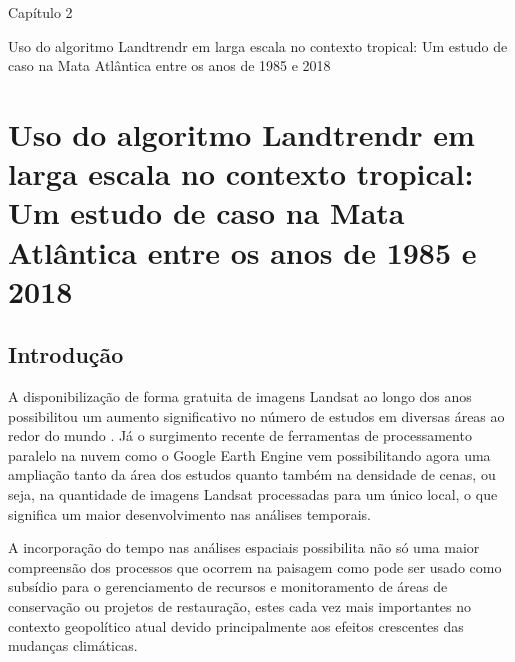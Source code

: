 \begin{titlepage}
    \centering
    \vspace*{\fill}

    \vspace*{0.5cm}
    
    \Large%
    Capítulo 2

    \vspace*{1cm}

    \Large%
    Uso do algoritmo Landtrendr em larga escala no contexto tropical: Um estudo de caso na Mata Atlântica entre os anos de 1985 e 2018

    \vspace*{5cm}


    \vspace*{\fill}
\end{titlepage}

\section{Uso do algoritmo Landtrendr em larga escala no contexto tropical: Um estudo de caso na Mata Atlântica entre os anos de 1985 e 2018}


\subsection{Introdução}
\hspace{13pt} A disponibilização de forma gratuita de imagens Landsat ao longo dos anos possibilitou um aumento significativo no número de estudos em diversas áreas ao redor do mundo \citep{ZHU2019382, WULDER20122}. Já o surgimento recente de ferramentas de processamento paralelo na nuvem como o Google Earth Engine \citep{GORELICK201718} vem possibilitando agora uma ampliação tanto da área dos estudos quanto também na densidade de cenas, ou seja, na quantidade de imagens Landsat processadas para um único local, o que significa um maior desenvolvimento nas análises temporais.

A incorporação do tempo nas análises espaciais possibilita não só uma maior compreensão dos processos que ocorrem na paisagem como pode ser usado como subsídio para o gerenciamento de recursos e monitoramento de áreas de conservação ou projetos de restauração, estes cada vez mais importantes no contexto geopolítico atual devido principalmente aos efeitos crescentes das mudanças climáticas.

